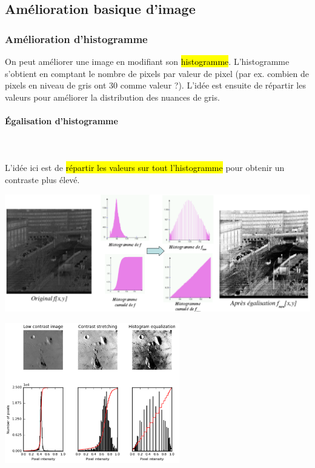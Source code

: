 \documentclass[letterpaper, 12pt]{article}
\newcommand{\alinea}{
\hspace*{0.5cm}}
\begin{document}
	\subsection{Amélioration basique d'image}
		\subsubsection{Amélioration d'histogramme}
			\alinea On peut améliorer une image en modifiant son \hl{histogramme}. L'histogramme s'obtient en comptant le nombre
				de pixels par valeur de pixel (par ex. combien de pixels en niveau de gris ont 30 comme valeur ?). 
				L'idée est ensuite de répartir les valeurs pour améliorer la distribution des nuances de gris.
			\paragraph{\'Egalisation d'histogramme}~\\~\\
				\alinea L'idée ici est de \hl{répartir les valeurs sur tout l'histogramme} pour obtenir un contraste plus élevé.
					\begin{center}
						\includegraphics[width=6in]{Images/histo1}
					\end{center}
					\begin{center}
						\includegraphics[width=3in]{Images/histo2}
					\end{center}
\end{document}
